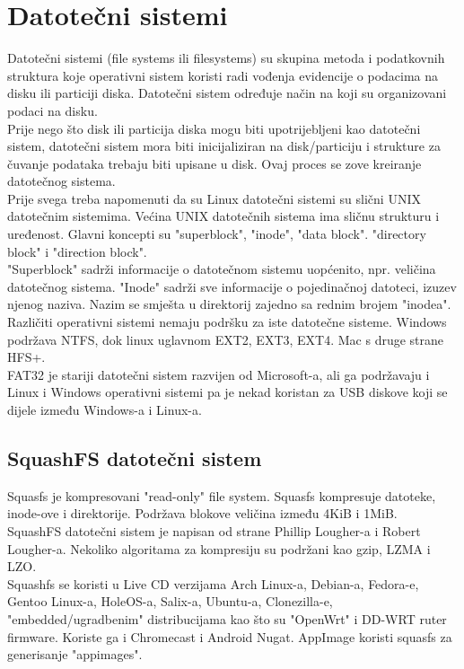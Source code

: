 \documentclass[12pt,vi]{mitthesis}
\begin{document}
\section*{Datotečni sistemi}
\indent
Datotečni sistemi (file systems ili filesystems) su skupina metoda i podatkovnih struktura koje operativni sistem koristi radi vođenja evidencije o podacima na disku ili particiji diska. Datotečni sistem određuje način na koji su organizovani podaci na disku.\\
Prije nego što disk ili particija diska mogu biti upotrijebljeni kao datotečni sistem, datotečni sistem mora biti inicijaliziran na disk/particiju i strukture za čuvanje podataka trebaju biti upisane u disk. Ovaj proces se zove kreiranje datotečnog sistema.\\
Prije svega treba napomenuti da su Linux datotečni sistemi su slični UNIX datotečnim sistemima. Većina UNIX datotečnih sistema ima sličnu strukturu i uređenost. Glavni koncepti su "superblock", "inode", "data block". "directory block" i "direction block".\\
"Superblock" sadrži informacije o datotečnom sistemu uopćenito, npr. veličina datotečnog sistema. "Inode" sadrži sve informacije o pojedinačnoj datoteci, izuzev njenog naziva. Nazim se smješta u direktorij zajedno sa rednim brojem "inodea".
\\
Različiti operativni sistemi nemaju podršku za iste datotečne sisteme. Windows podržava NTFS, dok linux uglavnom EXT2, EXT3, EXT4. Mac s druge strane HFS+.\\
FAT32 je stariji datotečni sistem razvijen od Microsoft-a, ali ga podržavaju i Linux i Windows operativni sistemi pa je nekad koristan za USB diskove koji se dijele između Windows-a i Linux-a.
\subsection*{SquashFS datotečni sistem}
\indent
Squasfs je kompresovani "read-only" file system. Squasfs kompresuje datoteke, inode-ove i direktorije. Podržava blokove veličina između 4KiB i 1MiB.\\
\indent
SquashFS datotečni sistem je napisan od strane 	Phillip Lougher-a i Robert Lougher-a. 
Nekoliko algoritama za kompresiju su podržani kao gzip, LZMA i LZO.\\
Squashfs se koristi u Live CD verzijama Arch Linux-a, Debian-a, Fedora-e, Gentoo Linux-a, HoleOS-a, Salix-a, Ubuntu-a, Clonezilla-e, "embedded/ugradbenim" distribucijama kao što su "OpenWrt" i DD-WRT ruter firmware. Koriste ga i Chromecast i Android Nugat. AppImage koristi squasfs za generisanje "appimages".\\
\end{document}
